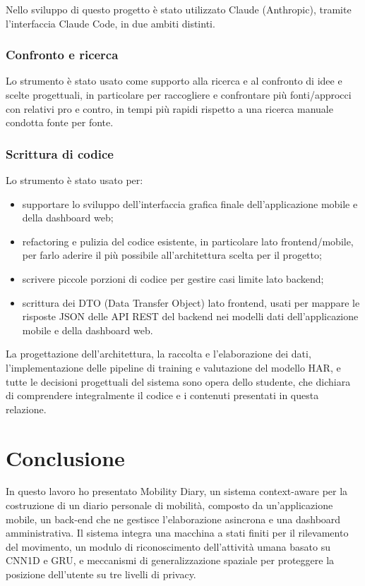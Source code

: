 \documentclass[conference]{IEEEtran}
\begin{document}
Nello sviluppo di questo progetto è stato utilizzato Claude (Anthropic),
tramite l'interfaccia Claude Code, in due ambiti distinti.

\subsubsection{Confronto e ricerca}

Lo strumento è stato usato come
supporto alla ricerca e al confronto di idee e scelte progettuali,
in particolare per
raccogliere e confrontare più fonti/approcci con relativi
pro e contro, in tempi più rapidi rispetto a una ricerca manuale
condotta fonte per fonte.

\subsubsection{Scrittura di codice}

Lo strumento è stato usato per:
\begin{itemize}
  \item supportare lo sviluppo dell'interfaccia grafica finale
  dell'applicazione mobile e della dashboard web;
  \item refactoring e pulizia del codice esistente, in particolare lato
  frontend/mobile, per farlo aderire il più possibile
  all'architettura scelta per il progetto;
  \item scrivere piccole porzioni di codice per gestire casi limite
  lato backend;
  \item scrittura dei DTO (Data Transfer Object) lato frontend, usati
  per mappare le risposte JSON delle API REST del backend nei modelli
  dati dell'applicazione mobile e della dashboard web.
\end{itemize}



La progettazione dell'architettura, la raccolta e l'elaborazione dei
dati, l'implementazione delle pipeline di training e valutazione del
modello HAR, e tutte le decisioni progettuali del sistema sono opera
dello studente, che dichiara di comprendere integralmente il codice e
i contenuti presentati in questa relazione.

\section*{Conclusione}

In questo lavoro ho presentato Mobility Diary, un sistema
context-aware per la costruzione di un diario personale di mobilità,
composto da un'applicazione mobile, un back-end che ne gestisce
l'elaborazione asincrona e una dashboard amministrativa. Il sistema
integra una macchina a stati finiti per il rilevamento del movimento,
un modulo di riconoscimento dell'attività umana basato su CNN1D e
GRU, e meccanismi di generalizzazione spaziale per proteggere la
posizione dell'utente su tre livelli di privacy.
\end{document}
